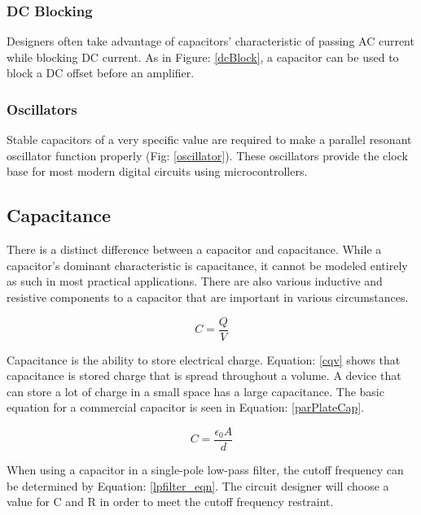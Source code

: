 \subsubsection{DC Blocking}

Designers often take advantage of capacitors' characteristic of passing AC current while blocking DC current. As in Figure: \ref{dcBlock}, a capacitor can be used to block a DC offset before an amplifier.

\subsubsection{Oscillators}


Stable capacitors of a very specific value are required to make a parallel resonant oscillator function properly (Fig: \ref{oscillator}). These oscillators provide the clock base for most modern digital circuits using microcontrollers.

\subsection{Capacitance}

There is a distinct difference between a capacitor and capacitance. While a capacitor's dominant characteristic is capacitance, it cannot be modeled entirely as such in most practical applications. There are also various inductive and resistive components to a capacitor that are important in various circumstances.

\begin{equation}
\label{cqv}
C=\frac{Q}{V}
\end{equation}

Capacitance is the ability to store electrical charge. Equation: \eqref{cqv} shows that capacitance is stored charge that is spread throughout a volume. A device that can store a lot of charge in a small space has a large capacitance. The basic equation for a commercial capacitor is seen in Equation: \eqref{parPlateCap}.

\begin{equation}
\label{parPlateCap}
C = \frac{\epsilon _0 A}{d}
\end{equation}

When using a capacitor in a single-pole low-pass filter, the cutoff frequency can be determined by Equation: \eqref{lpfilter_eqn}. The circuit designer will choose a value for C and R in order to meet the cutoff frequency restraint.

